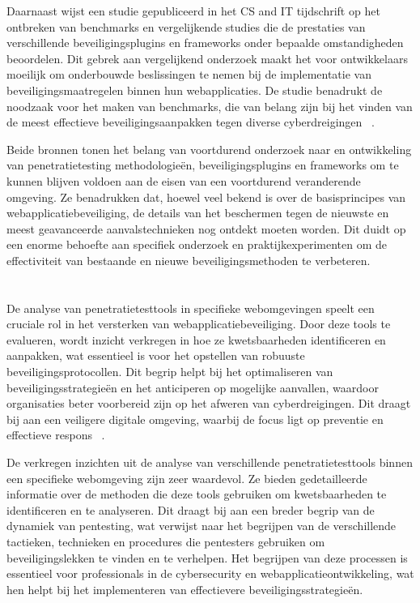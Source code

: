 Daarnaast wijst een studie gepubliceerd in het CS and IT tijdschrift op het ontbreken van benchmarks en vergelijkende studies die de prestaties van verschillende 
beveiligingsplugins en frameworks onder bepaalde omstandigheden beoordelen. Dit gebrek aan vergelijkend onderzoek maakt het voor ontwikkelaars 
moeilijk om onderbouwde beslissingen te nemen bij de implementatie van beveiligingsmaatregelen binnen hun webapplicaties. De studie benadrukt de noodzaak voor 
het maken van benchmarks, die van belang zijn bij het vinden van de meest effectieve beveiligingsaanpakken tegen diverse cyberdreigingen ~\autocite{AbuDabaseh2018}.

Beide bronnen tonen het belang van voortdurend onderzoek naar en ontwikkeling van penetratietesting methodologieën, beveiligingsplugins en frameworks om te kunnen 
blijven voldoen aan de eisen van een voortdurend veranderende omgeving. Ze benadrukken dat, hoewel veel bekend is over de basisprincipes van webapplicatiebeveiliging, 
de details van het beschermen tegen de nieuwste en meest geavanceerde aanvalstechnieken nog ontdekt moeten worden. Dit duidt op een enorme behoefte aan 
specifiek onderzoek en praktijkexperimenten om de effectiviteit van bestaande en nieuwe beveiligingsmethoden te verbeteren.

\section{}
\subsection{}
De analyse van penetratietesttools in specifieke webomgevingen speelt een cruciale rol in het versterken van webapplicatiebeveiliging. Door deze tools 
te evalueren, wordt inzicht verkregen in hoe ze kwetsbaarheden identificeren en aanpakken, wat essentieel is voor het opstellen van robuuste beveiligingsprotocollen. 
Dit begrip helpt bij het optimaliseren van beveiligingsstrategieën en het anticiperen op mogelijke aanvallen, waardoor organisaties beter voorbereid zijn op het 
afweren van cyberdreigingen. Dit draagt bij aan een veiligere digitale omgeving, waarbij de focus ligt op preventie en effectieve respons
~\autocite{Jarupunphol2023}.

De verkregen inzichten uit de analyse van verschillende penetratietesttools binnen een specifieke webomgeving zijn zeer waardevol. Ze bieden gedetailleerde informatie 
over de methoden die deze tools gebruiken om kwetsbaarheden te identificeren en te analyseren. Dit draagt bij aan een breder begrip van de dynamiek van pentesting, wat 
verwijst naar het begrijpen van de verschillende tactieken, technieken en procedures die pentesters gebruiken om beveiligingslekken te vinden en te verhelpen. Het 
begrijpen van deze processen is essentieel voor professionals in de cybersecurity en webapplicatieontwikkeling, wat hen helpt bij het implementeren van effectievere 
beveiligingsstrategieën.

